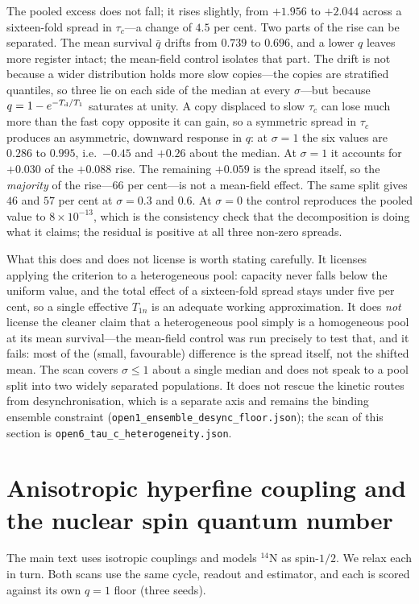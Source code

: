 \documentclass[aps,prx,reprint,superscriptaddress,nofootinbib,floatfix]{revtex4-2}
\begin{document}
The pooled excess does not fall; it rises slightly, from $+1.956$ to $+2.044$
across a sixteen-fold spread in $\tau_c$---a change of $4.5$ per cent. Two parts of
the rise can be separated. The mean survival $\bar q$ drifts from $0.739$ to
$0.696$, and a lower $q$ leaves more register intact; the mean-field control
isolates that part. The drift is not because a wider distribution holds more slow
copies---the copies are stratified quantiles, so three lie on each side of the
median at every $\sigma$---but because $q=1-e^{-T_{\rm d}/T_1}$ saturates at
unity. A copy displaced to slow $\tau_c$ can lose much more than the fast copy
opposite it can gain, so a symmetric spread in $\tau_c$ produces an asymmetric,
downward response in $q$: at $\sigma=1$ the six values are $0.286$ to $0.995$,
i.e.\ $-0.45$ and $+0.26$ about the median. At $\sigma=1$ it accounts for $+0.030$ of the $+0.088$ rise. The remaining
$+0.059$ is the spread itself, so the \emph{majority} of the rise---$66$ per
cent---is not a mean-field effect. The same split gives $46$ and $57$ per cent at
$\sigma=0.3$ and $0.6$. At $\sigma=0$ the control reproduces the pooled value to
$8\times10^{-13}$, which is the consistency check that the decomposition is doing
what it claims; the residual is positive at all three non-zero spreads.

What this does and does not license is worth stating carefully. It licenses
applying the criterion to a heterogeneous pool: capacity never falls below the
uniform value, and the total effect of a sixteen-fold spread stays under five per
cent, so a single effective $T_{1n}$ is an adequate working approximation. It does
\emph{not} license the cleaner claim that a heterogeneous pool simply is a
homogeneous pool at its mean survival---the mean-field control was run precisely
to test that, and it fails: most of the (small, favourable) difference is the
spread itself, not the shifted mean. The scan covers $\sigma\le1$ about a single
median and does not speak to a pool split into two widely separated populations. It does not rescue the
kinetic routes from desynchronisation, which is a separate axis and remains the
binding ensemble constraint (\texttt{open1\_ensemble\_desync\_floor.json}); the
scan of this section is \texttt{open6\_tau\_c\_heterogeneity.json}.

\section{Anisotropic hyperfine coupling and the nuclear spin quantum number}
\label{sec:aniso}
The main text uses isotropic couplings and models $^{14}$N as spin-$1/2$. We relax
each in turn. Both scans use the same cycle, readout and estimator, and each is
scored against its own $q=1$ floor (three seeds).
\end{document}
